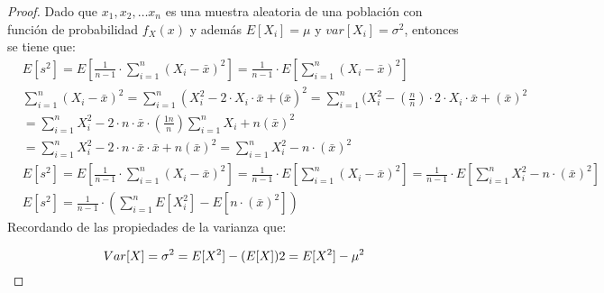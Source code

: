 \begin{proof}
    Dado que $x_1,x_2,\dots x_n$ es una muestra aleatoria
    de una población con función de probabilidad
    $f_X(x)$ y además $E[X_i]=\mu$  y $var[X_i]= \sigma^2$, entonces
    se tiene que:
\begin{align*}
         & E\left[ s^2 \right]=E\left[ \frac{1}{n-1}\cdot \sum_{i=1}^n(X_i-\bar{x} )^2 \right]=\frac{1}{n-1}\cdot  E\left[ \sum_{i=1}^n(X_i-\bar{x})^2 \right]                                                                         \\
         & \sum_{i=1}^n\left( X_i-\bar{x} \right)^2=\sum_{i=1}^n\left( X_i^2-2\cdot X_i\cdot  \bar{x}+(\bar{x} \right)^2=\sum_{i=1}^n(X_i^2-(\frac{n}{n})\cdot  2\cdot X_i\cdot  \bar{x}+\left( \bar{x} \right)^2                      \\
         & =\sum_{i=1}^nX_i^2-2\cdot n\cdot \bar{x}\cdot  (\frac{1n}{n})\sum_{i=1}^nX_i+n(\bar{x})^2                                                                                                                                   \\
         & =\sum_{i=1}^nX_i^2-2\cdot n\cdot \bar{x}\cdot  \bar{x}+n (\bar{x})^2=\sum_{i=1}^nX_i^2-n\cdot  (\bar{x} )^2                                                                                                                 \\
         & E[s^2]=E\left[ \frac{1}{n-1}\cdot  \sum_{i=1}^n\left( X_i-\bar{x} \right)^2 \right]=\frac{1}{n-1}\cdot  E[\sum_{i=1}^n\left( X_i-\bar{x} \right)^2]=\frac{1}{n-1}\cdot E\left[ \sum_{i=1}^nX_i^2-n\cdot (\bar{x})^2 \right] \\
         & E[s^2]=\frac{1}{n-1}\cdot  \left( \sum_{i=1}^nE\left[ X_i^2 \right]-E\left[ n\cdot  (\bar{x})^2 \right] \right)
    \end{align*}
    Recordando de las propiedades de
    la varianza que:

    \begin{equation*}
        Var[X]=\sigma^2=E[X^2]-(E[X ])2=E[X^2]-\mu^2\\
    \end{equation*}


\end{proof}
